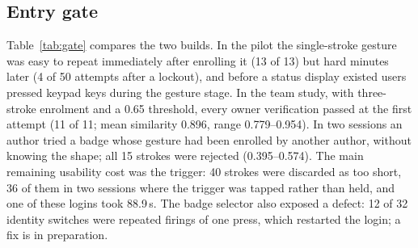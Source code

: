 \subsection{Entry gate}
Table~\ref{tab:gate} compares the two builds. In the pilot the single-stroke gesture was easy to repeat immediately after enrolling it (13 of 13) but hard minutes later (4 of 50 attempts after a lockout), and before a status display existed users pressed keypad keys during the gesture stage. In the team study, with three-stroke enrolment and a 0.65 threshold, every owner verification passed at the first attempt (11 of 11; mean similarity 0.896, range 0.779--0.954). In two sessions an author tried a badge whose gesture had been enrolled by another author, without knowing the shape; all 15 strokes were rejected (0.395--0.574). The main remaining usability cost was the trigger: 40 strokes were discarded as too short, 36 of them in two sessions where the trigger was tapped rather than held, and one of these logins took 88.9\,s. The badge selector also exposed a defect: 12 of 32 identity switches were repeated firings of one press, which restarted the login; a fix is in preparation.

\begin{table}[t]
\caption{Entry gate and enrolment, from on-device logs.}
\label{tab:gate}
\centering\footnotesize
\setlength{\tabcolsep}{3pt}
\end{table}

